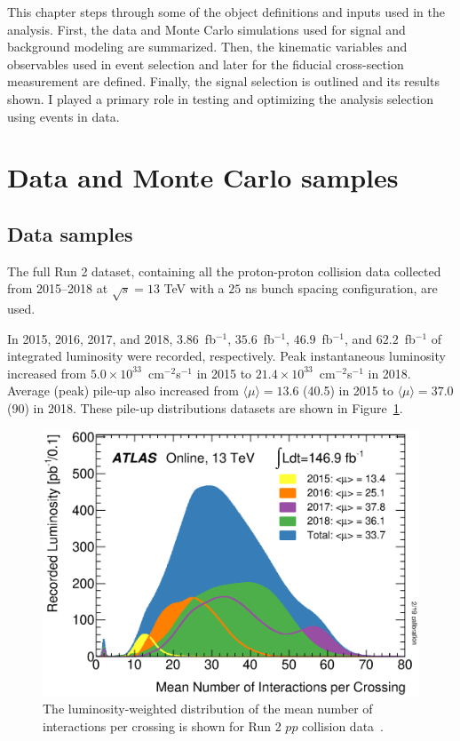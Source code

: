 This chapter steps through some of the object definitions and inputs used in the analysis. First, the data and Monte Carlo simulations used for signal and background modeling are summarized. Then, the kinematic variables and observables used in event selection and later for the fiducial cross-section measurement are defined. Finally, the signal selection is outlined and its results shown. I played a primary role in testing and optimizing the analysis selection using events in data.  

\section{Data and Monte Carlo samples}
\subsection{Data samples}

The full Run 2 dataset, containing all the proton-proton collision data collected from 2015--2018 at $\sqrt{s}=13$ TeV with a $25$ ns bunch spacing configuration, are used.

In 2015, 2016, 2017, and 2018, $3.86$~fb$^{-1}$, $35.6$~fb$^{-1}$, $46.9$~fb$^{-1}$, and  $62.2$~fb$^{-1}$ of integrated luminosity were recorded, respectively. Peak instantaneous luminosity increased from $5.0\times 10^{33}$~cm$^{-2}$s$^{-1}$ in 2015 to $21.4\times 10^{33}$~cm$^{-2}$s$^{-1}$ in 2018. Average (peak) pile-up also increased from $\langle\mu\rangle=13.6$ (40.5) in 2015 to  $\langle\mu\rangle=37.0$ (90) in 2018. These pile-up distributions datasets are shown in Figure~\ref{fig:mu_profile}. 

\begin{figure}[!htbp]
    \centering 
    \includegraphics[width=0.55\linewidth]{Pictures/mu_2015_2018.eps}
    \caption{The luminosity-weighted distribution of the mean number of interactions per crossing is shown for Run 2 $pp$ collision data~\cite{lumigroup}. }
    \label{fig:mu_profile}
\end{figure}

